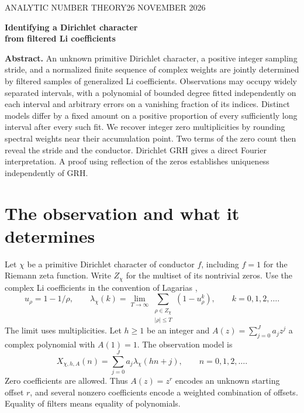 \documentclass[11pt]{article}
\newcommand{\model}{X_{\chi,h,A}}
\begin{document}
\thispagestyle{plain}
{\noindent\sffamily\small\color{ink} ANALYTIC NUMBER THEORY\hfill 26 NOVEMBER 2026\par}
\vspace{.8em}
{\noindent\LARGE\bfseries\color{ink}Identifying a Dirichlet character\\[2pt] from filtered Li coefficients\par}
\vspace{.7em}
\noindent\textbf{Abstract.}
An unknown primitive Dirichlet character, a positive integer sampling stride, and a normalized finite sequence of complex weights are jointly determined by filtered samples of generalized Li coefficients. Observations may occupy widely separated intervals, with a polynomial of bounded degree fitted independently on each interval and arbitrary errors on a vanishing fraction of its indices. Distinct models differ by a fixed amount on a positive proportion of every sufficiently long interval after every such fit. We recover integer zero multiplicities by rounding spectral weights near their accumulation point. Two terms of the zero count then reveal the stride and the conductor. Dirichlet GRH gives a direct Fourier interpretation. A proof using reflection of the zeros establishes uniqueness independently of GRH.

\section{The observation and what it determines}
Let $\chi$ be a primitive Dirichlet character of conductor $f$, including $f=1$ for the Riemann zeta function. Write $Z_\chi$ for the multiset of its nontrivial zeros. Use the complex Li coefficients in the convention of Lagarias \cite[Lemma 2.3]{lagarias},
\begin{equation}
 u_\rho=1-1/\rho,\qquad
 \lambda_\chi(k)=\lim_{T\to\infty}\sum_{\substack{\rho\in Z_\chi\\|\rho|\le T}}(1-u_\rho^k),
 \qquad k=0,1,2,\ldots. \label{eq:li}
\end{equation}
The limit uses multiplicities. Let $h\ge1$ be an integer and $A(z)=\sum_{j=0}^J a_jz^j$ a complex polynomial with $A(1)=1$. The observation model is
\begin{equation}
 \model(n)=\sum_{j=0}^J a_j\lambda_\chi(hn+j),\qquad n=0,1,2,\ldots. \label{eq:model}
\end{equation}
Zero coefficients are allowed. Thus $A(z)=z^r$ encodes an unknown starting offset $r$, and several nonzero coefficients encode a weighted combination of offsets. Equality of filters means equality of polynomials.
\end{document}
